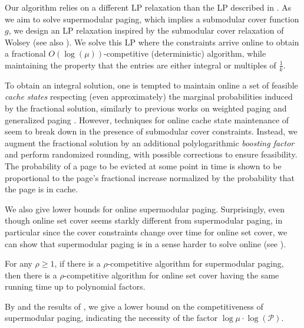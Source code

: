 \documentclass[11pt]{article}
\newcommand{\cP}{{\mathcal{P}}}
\begin{document}
Our algorithm relies on a different LP relaxation than the LP described in . As we aim to solve supermodular paging, which implies a submodular cover function $g$, we design an LP relaxation inspired by the submodular cover relaxation of Wolsey \cite{wolsey1982analysis} (see also \cite{gupta2020online}). We solve this LP where the constraints arrive online to obtain a fractional $O(\log(\mu))$-competitive (deterministic) algorithm, while maintaining the property that the entries are either integral or multiples of $\frac{1}{k}$. 

To obtain an integral solution, one is tempted to maintain online a set of feasible {\em cache states} respecting (even approximately) the marginal probabilities induced by the fractional solution, similarly to previous works on weighted paging and generalized paging \cite{bansal2012primal,bansal2012randomized,adamaszek2018log}. However, techniques for online cache state maintenance of \cite{bansal2012primal,bansal2012randomized,adamaszek2018log} seem to break down in the presence of submodular cover constraints. Instead, we augment the fractional solution by an additional polylogarithmic {\em boosting factor} and perform randomized rounding, with possible corrections to ensure feasibility. The probability of a page to be evicted at some point in time is shown to be proportional to the page's fractional increase normalized by the probability that the page is in cache. 

We also give lower bounds for online supermodular paging. Surprisingly, even though online set cover seems starkly different from supermodular paging, in particular since the cover constraints change over time for online set cover, we can show that supermodular paging is in a sense harder to solve online (see ).

\begin{theorem}
	\label{lem:Set Cover}
	For any $\rho \geq 1$, if there is a $\rho$-competitive algorithm for \textnormal{supermodular paging}, then there is a $\rho$-competitive algorithm for \textnormal{online set cover} having the same running time up to polynomial factors.  
\end{theorem}


By  and the results of \cite{alon2003online,korman2004use}, we give a lower bound on the competitiveness of supermodular paging, indicating the necessity of the factor $\log \mu \cdot \log \left(\cP\right)$.
\end{document}
